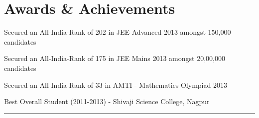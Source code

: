 \documentclass[letterpaper]{Formatting}
\begin{document}
\begin{minipage}[t]{0.66\textwidth}
\section{Awards \& Achievements} 
\vspace{\topsep}
\small{
\begin{tightitemize}
\item Secured an All-India-Rank of 202 in JEE Advanced 2013 amongst 150,000 candidates\\
\item Secured an All-India-Rank of 175 in JEE Mains 2013 amongst 20,00,000 candidates\\
\item Secured an All-India-Rank of 33 in AMTI - Mathematics Olympiad 2013\\
\item Best Overall Student (2011-2013) - Shivaji Science College, Nagpur \\
\end{tightitemize}
}
\sectionspace %
\vspace{2ex}
\rule{12cm}{0.25pt}
\end{minipage} %







\end{document}
